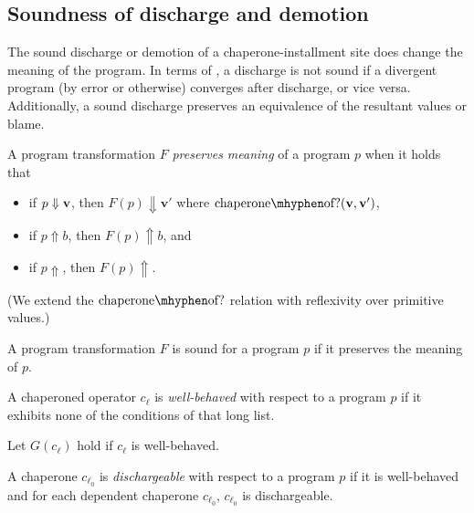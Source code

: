 
\subsection{Soundness of discharge and demotion}

The sound discharge or demotion of a chaperone-installment site does change the meaning of the program.
In terms of \chapcalc, a discharge is not sound if a divergent program (by error or otherwise) converges after discharge, or vice versa.
Additionally, a sound discharge preserves an equivalence of the resultant values or blame.

\begin{definition}
A program transformation $F$ \emph{preserves meaning} of a program $p$ when it holds that
\begin{itemize}
\item if $p\Downarrow\mathbf{v}$, then $F(p)\Downarrow\mathbf{v'}$ where $\mathrm{chaperone\mhyphen of?}(\vv,\vvp)$,
\item if $p\Uparrow b$, then $F(p)\Uparrow b$, and
\item if $p\Uparrow$, then $F(p)\Uparrow$.
\end{itemize}
\end{definition}

(We extend the $\mathrm{chaperone\mhyphen of?}$ relation with reflexivity over primitive values.)

\begin{definition}
A program transformation $F$ is sound for a program $p$ if it preserves the meaning of $p$.
\end{definition}

\begin{definition}
A chaperoned operator $c_\ell$ is \emph{well-behaved} with respect to a program $p$ if it exhibits none of the conditions of that long list.
\end{definition}

Let $G(c_\ell)$ hold if $c_\ell$ is well-behaved.

\begin{definition}
A chaperone $c_{\ell_0}$ is \emph{dischargeable} with respect to a program $p$ if it is well-behaved and for each dependent chaperone $c_{\ell_0}$, $c_{\ell_0}$ is dischargeable.
\end{definition}

